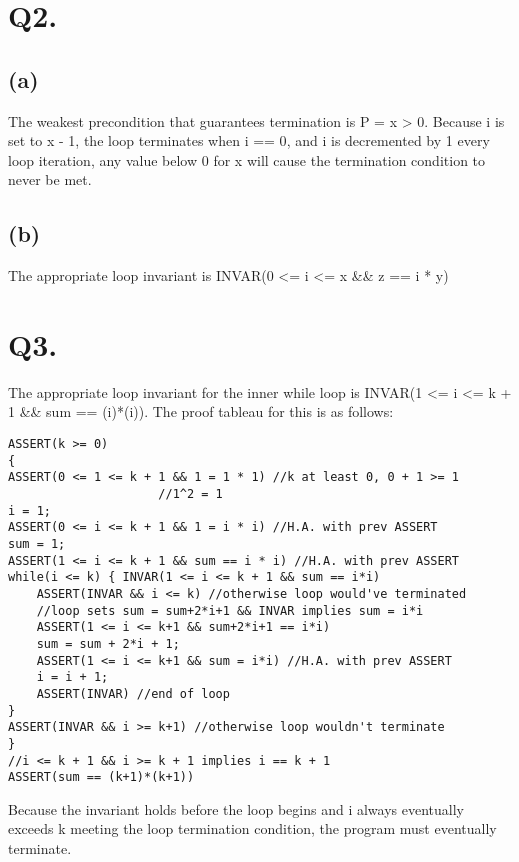 \documentclass{article}
\begin{document}
	\section*{Q2.}
	\subsection*{(a)}
	The weakest precondition that guarantees termination is {\selectfont P = x > 0}. Because {\selectfont i} is set to {\selectfont x - 1}, the loop terminates when {\selectfont i == 0}, and {\selectfont i} is decremented by 1 every loop iteration, any value below 0 for {\selectfont x} will cause the termination condition to never be met.
	\subsection*{(b)}
	The appropriate loop invariant is {\selectfont INVAR(0 <= i <= x \&\& z == i * y)}
	
	\section*{Q3.}
	The appropriate loop invariant for the inner while loop is {\selectfont INVAR(1 <= i <= k + 1 \&\& sum == (i)*(i))}. The proof tableau for this is as follows:
	{\selectfont
	\begin{lstlisting}
ASSERT(k >= 0)
{
ASSERT(0 <= 1 <= k + 1 && 1 = 1 * 1) //k at least 0, 0 + 1 >= 1
				     //1^2 = 1 
i = 1;
ASSERT(0 <= i <= k + 1 && 1 = i * i) //H.A. with prev ASSERT
sum = 1;
ASSERT(1 <= i <= k + 1 && sum == i * i) //H.A. with prev ASSERT
while(i <= k) { INVAR(1 <= i <= k + 1 && sum == i*i)
	ASSERT(INVAR && i <= k) //otherwise loop would've terminated
	//loop sets sum = sum+2*i+1 && INVAR implies sum = i*i
	ASSERT(1 <= i <= k+1 && sum+2*i+1 == i*i)
	sum = sum + 2*i + 1;
	ASSERT(1 <= i <= k+1 && sum = i*i) //H.A. with prev ASSERT
	i = i + 1;
	ASSERT(INVAR) //end of loop
}
ASSERT(INVAR && i >= k+1) //otherwise loop wouldn't terminate
}
//i <= k + 1 && i >= k + 1 implies i == k + 1
ASSERT(sum == (k+1)*(k+1))
	\end{lstlisting}
	}
	Because the invariant holds before the loop begins and i always eventually exceeds k meeting the loop termination condition, the program must eventually terminate.
\end{document}
